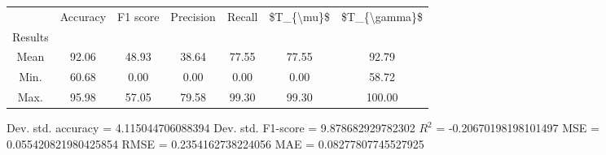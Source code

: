 \begin{tabular}{|c|c|c|c|c|c|c|}
\toprule
{} &  Accuracy &  F1 score &  Precision &  Recall &  \$T\_\{\textbackslash mu\}\$ &  \$T\_\{\textbackslash gamma\}\$ \\
Results &           &           &            &         &            &               \\
\hline
Mean    &     92.06 &     48.93 &      38.64 &   77.55 &      77.55 &         92.79 \\
Min.    &     60.68 &      0.00 &       0.00 &    0.00 &       0.00 &         58.72 \\
Max.    &     95.98 &     57.05 &      79.58 &   99.30 &      99.30 &        100.00 \\
\bottomrule
\end{tabular}

 Dev. std. accuracy = 4.115044706088394
 Dev. std. F1-score = 9.878682929782302
 $R^2$ = -0.20670198198101497
 MSE = 0.055420821980425854
 RMSE = 0.2354162738224056
 MAE = 0.08277807745527925
